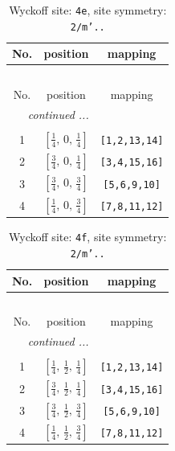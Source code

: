 \documentclass[fleqn,8pt]{jsarticle}
\begin{document}
\renewcommand{\arraystretch}{1.2}
\begin{longtable}{ccc}
\caption{Wyckoff site: {\tt 4e}, site symmetry: {\tt 2/m'..}}
 \\
 \hline \hline
No. & position & mapping \\ \hline \endfirsthead

\multicolumn{2}{l}{\tablename\ \thetable{}} \\
 \hline \hline
No. & position & mapping \\ \hline \endhead

 \hline \hline
\multicolumn{2}{r}{\footnotesize\it continued ...} \\ \endfoot

 \hline \hline
\multicolumn{2}{r}{} \\ \endlastfoot

1 & $\left[ \frac{1}{4},\, 0,\, \frac{1}{4} \right]$ & {\tt [1,2,13,14]} \\ \hline
2 & $\left[ \frac{3}{4},\, 0,\, \frac{1}{4} \right]$ & {\tt [3,4,15,16]} \\ \hline
3 & $\left[ \frac{3}{4},\, 0,\, \frac{3}{4} \right]$ & {\tt [5,6,9,10]} \\ \hline
4 & $\left[ \frac{1}{4},\, 0,\, \frac{3}{4} \right]$ & {\tt [7,8,11,12]} \\
\end{longtable}
\renewcommand{\arraystretch}{1.2}
\begin{longtable}{ccc}
\caption{Wyckoff site: {\tt 4f}, site symmetry: {\tt 2/m'..}}
 \\
 \hline \hline
No. & position & mapping \\ \hline \endfirsthead

\multicolumn{2}{l}{\tablename\ \thetable{}} \\
 \hline \hline
No. & position & mapping \\ \hline \endhead

 \hline \hline
\multicolumn{2}{r}{\footnotesize\it continued ...} \\ \endfoot

 \hline \hline
\multicolumn{2}{r}{} \\ \endlastfoot

1 & $\left[ \frac{1}{4},\, \frac{1}{2},\, \frac{1}{4} \right]$ & {\tt [1,2,13,14]} \\ \hline
2 & $\left[ \frac{3}{4},\, \frac{1}{2},\, \frac{1}{4} \right]$ & {\tt [3,4,15,16]} \\ \hline
3 & $\left[ \frac{3}{4},\, \frac{1}{2},\, \frac{3}{4} \right]$ & {\tt [5,6,9,10]} \\ \hline
4 & $\left[ \frac{1}{4},\, \frac{1}{2},\, \frac{3}{4} \right]$ & {\tt [7,8,11,12]} \\
\end{longtable}
\end{document}
